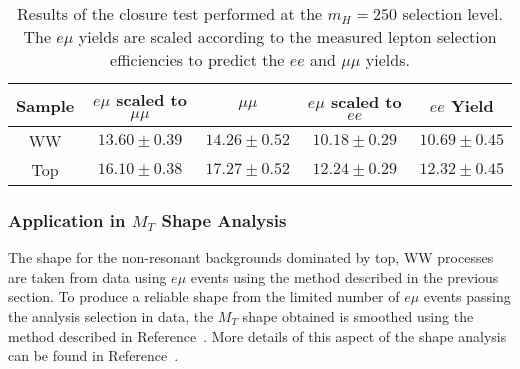 \begin{table}[!ht]
\begin{center}
\begin{tabular}{c|c|c|c|c}
\hline
Sample   & $e\mu$ scaled to $\mu\mu$ & $\mu\mu$ & $e\mu$ scaled to $ee$ &  $ee$ Yield \\ \hline 
\hline
WW   & $13.60 \pm 0.39$ & $14.26 \pm 0.52$ & $10.18 \pm 0.29$ & $10.69 \pm 0.45$\\ \hline 
Top   & $16.10 \pm 0.38$ & $17.27 \pm 0.52$ & $12.24 \pm 0.29$ & $12.32 \pm 0.45$\\ \hline 
\end{tabular}
\caption{Results of the closure test performed at the $m_H=250$ selection level.
The $e\mu$ yields are scaled according to the measured lepton selection efficiencies 
to predict the $ee$ and $\mu\mu$ yields.}
\label{tab:ofmc}
\end{center}
\end{table}

\subsubsection{Application in $M_T$ Shape Analysis}

The shape for the non-resonant backgrounds dominated by top, WW processes
are taken from data using $e\mu$ events using the method described in
the previous section.
To produce a reliable shape from the limited number of $e\mu$ events passing the 
analysis selection in data, the $M_{T}$ shape obtained is smoothed using the method described in 
Reference~\cite{SMOOTHING}.
More details of this aspect of the shape analysis can be found in Reference~\cite{shapeananote}.


